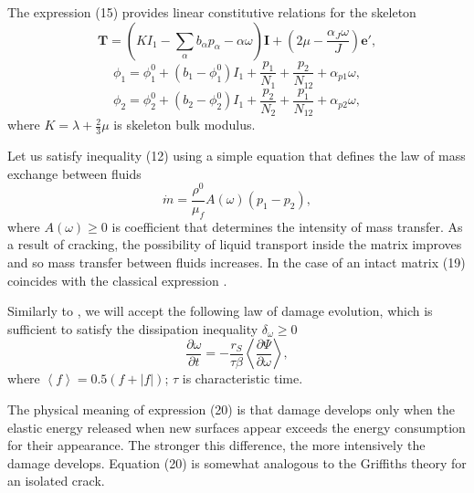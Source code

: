 \documentclass[article,authoryear,jpm]{beg_39}             %
\begin{document}
The expression (15) provides linear constitutive relations for the skeleton
\begin{equation}
\mathbf{T}=\left( K{{I}_{1}}-\sum\limits_{\alpha }{{{b}_{\alpha }}{{p}_{\alpha }}-\alpha \omega } \right)\mathbf{I}+\left( 2\mu -\frac{{{\alpha }_{J}}\omega }{J} \right)\mathbf{{e}'},
\end{equation}
\begin{equation}
{{\phi }_{1}}=\phi _{1}^{0}+\left( {{b}_{1}}-\phi _{1}^{0} \right){{I}_{1}}+\frac{{{p}_{1}}}{{{N}_{1}}}+\frac{{{p}_{2}}}{{{N}_{12}}}+{{\alpha }_{p1}}\omega ,
\end{equation}
\begin{equation}
{{\phi }_{2}}=\phi _{2}^{0}+\left( {{b}_{2}}-\phi _{2}^{0} \right){{I}_{1}}+\frac{{{p}_{2}}}{{{N}_{2}}}+\frac{{{p}_{1}}}{{{N}_{12}}}+{{\alpha }_{p2}}\omega ,
\end{equation}
where $K=\lambda +\frac{2}{3}\mu$ is skeleton bulk modulus.

Let us satisfy inequality (12) using a simple equation that defines the law of mass exchange between fluids
\begin{equation}
\dot{m}=\frac{\rho _{{}}^{0}}{{{\mu }_{f}}}A\left( \omega \right)\left( {{p}_{1}}-{{p}_{2}} \right),
\end{equation}
where $A\left( \omega \right)\ge 0$ is coefficient that determines the intensity of mass transfer.
As a result of cracking, the possibility of liquid transport inside the matrix improves and so mass transfer between fluids increases. In the case of an intact matrix (19) coincides with the classical expression \cite{Barenblatt}.

Similarly to \cite{Kondaurov2002, Izvekov, Izvekov2020}, we will accept the following law of damage evolution, which is sufficient to satisfy the dissipation inequality ${{\delta }_{\omega }}\ge 0$
\begin{equation}
\frac{\partial \omega }{\partial t}=-\frac{{{r}_{S}}}{\tau \beta }\left\langle \frac{\partial \Psi }{\partial \omega }
 \right\rangle ,%
\end{equation}
where $\left\langle f \right\rangle =0.5(f+|f|)$; $\tau$ is characteristic time.

The physical meaning of expression (20) is that damage develops only when the elastic energy released when new surfaces appear exceeds the energy consumption for their appearance. The stronger this difference, the more intensively the damage develops. Equation (20) is somewhat analogous to the Griffiths theory for an isolated crack.
\end{document}
